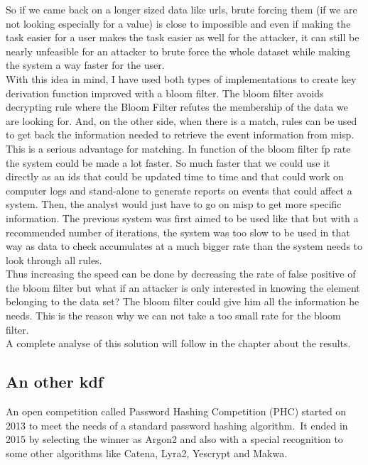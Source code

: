 \documentclass{eplmastersthesis}
\begin{document}
So if we came back on a longer sized data like \glspl{url}, brute forcing them (if we are not looking especially for a value) is close to impossible and even if making the task easier for a user makes the task easier as well for the attacker, it can still be nearly unfeasible for an attacker to brute force the whole dataset while making the system a way faster for the user.\\

With this idea in mind, I have used both types of implementations to create key derivation function improved with a bloom filter. The bloom filter avoids decrypting rule where the Bloom Filter refutes the membership of the data we are looking for. 
And, on the other side, when there is a match, rules can be used to get back the information needed to retrieve the event information from \gls{misp}.\\

This is a serious advantage for matching. In function of the bloom filter \gls{fp} rate the system could be made a lot faster. So much faster that we could use it directly as an \gls{ids} that could be updated time to time and that could work on computer logs and  stand-alone to generate reports on events that could affect a system. Then, the analyst would just have to go on \gls{misp} to get more specific information.
The previous system was first aimed to be used like that but with a recommended number of iterations, the system was too slow to be used in that way as data to check accumulates at a much bigger rate than the system needs to look through all rules.\\

Thus increasing the speed can be done by decreasing the rate of false positive of the bloom filter but what if an attacker is only interested in knowing the element belonging to the data set?
The bloom filter could give him all the information he needs. This is the reason why we can not take a too small rate for the bloom filter.\\

A complete analyse of this solution will follow in the chapter about the results.


\subsection{An other \gls{kdf}}
An open competition called Password Hashing Competition (PHC) started on 2013 to meet the needs of a standard password hashing algorithm.\
It ended in 2015 by selecting the winner as Argon2 and also with a special recognition to some other algorithms like Catena, Lyra2, Yescrypt and Makwa.\\
\end{document}
